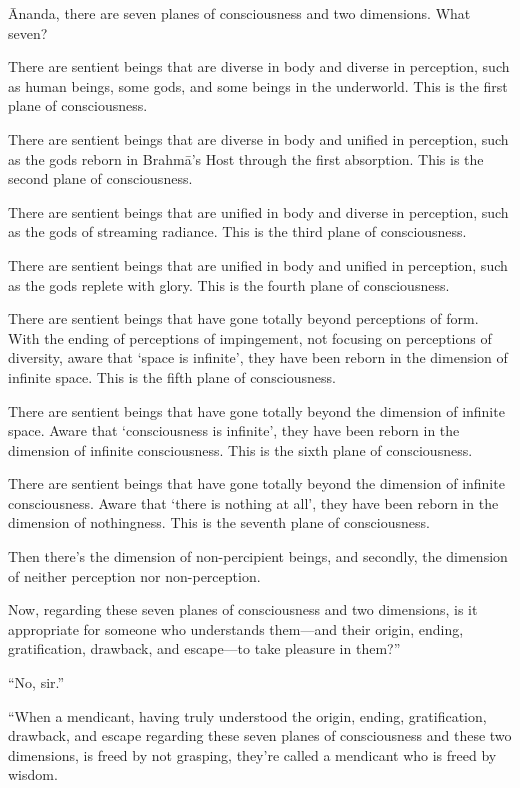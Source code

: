 \documentclass[12pt,openany]{book}%
\begin{document}
Ānanda, there are seven planes of consciousness and two dimensions. What seven? 

There are sentient beings that are diverse in body and diverse in perception, such as human beings, some gods, and some beings in the underworld. This is the first plane of consciousness. 

There are sentient beings that are diverse in body and unified in perception, such as the gods reborn in \textsanskrit{Brahmā}’s Host through the first absorption. This is the second plane of consciousness. 

There are sentient beings that are unified in body and diverse in perception, such as the gods of streaming radiance. This is the third plane of consciousness. 

There are sentient beings that are unified in body and unified in perception, such as the gods replete with glory. This is the fourth plane of consciousness. 

There are sentient beings that have gone totally beyond perceptions of form. With the ending of perceptions of impingement, not focusing on perceptions of diversity, aware that ‘space is infinite’, they have been reborn in the dimension of infinite space. This is the fifth plane of consciousness. 

There are sentient beings that have gone totally beyond the dimension of infinite space. Aware that ‘consciousness is infinite’, they have been reborn in the dimension of infinite consciousness. This is the sixth plane of consciousness. 

There are sentient beings that have gone totally beyond the dimension of infinite consciousness. Aware that ‘there is nothing at all’, they have been reborn in the dimension of nothingness. This is the seventh plane of consciousness. 

Then there’s the dimension of non-percipient beings, and secondly, the dimension of neither perception nor non-perception. 

Now, regarding these seven planes of consciousness and two dimensions, is it appropriate for someone who understands them—and their origin, ending, gratification, drawback, and escape—to take pleasure in them?” 

“No, sir.” 

“When a mendicant, having truly understood the origin, ending, gratification, drawback, and escape regarding these seven planes of consciousness and these two dimensions, is freed by not grasping, they’re called a mendicant who is freed by wisdom. 
\end{document}
